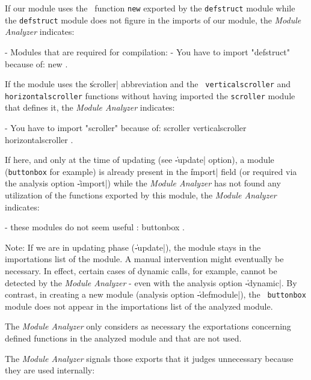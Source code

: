 If our module uses the \LeLisp\ function {\tt new} exported by the {\tt defstruct} module while the {\tt defstruct} module does not figure in the imports of our module, the {\em Module Analyzer} indicates:

\begin{Longcode*}
- Modules that are required for compilation:
- You have to import "defstruct" because of:
 new .
\end{Longcode*}

If the module uses the \|{scroller}| abbreviation and the {\tt
verticalscroller} and {\tt horizontalscroller} functions without having imported the {\tt scroller} module that defines it, the {\em Module Analyzer} indicates:

\begin{Longcode*}
- You have to import "scroller" because of:
 scroller verticalscroller horizontalscroller .
\end{Longcode*}

If here, and only at the time of updating (see \|-update| option), a module ({\tt buttonbox} for example) is already present in the \|import| field (or required via the analysis option \|-import|) while the {\em Module Analyzer} has not found any utilization of the functions exported by this module, the {\em Module Analyzer} indicates: 

\begin{Longcode*}
- these modules do not seem useful :
 buttonbox .
\end{Longcode*}
Note:  If we are in updating phase (\|-update|), the module stays in the importations list of the module.  A manual intervention might eventually be necessary.  In effect, certain cases of dynamic calls, for example, cannot be detected by the {\em Module Analyzer} - even with the analysis option \|-dynamic|.  By contrast, in creating a new module (analysis option \|-defmodule|), the {\tt
buttonbox} module does not appear in the importations list of the analyzed module.


The {\em Module Analyzer} only considers as necessary the exportations concerning defined functions in the analyzed module and that are not used.

The {\em Module Analyzer} signals those exports that it judges unnecessary because they are used internally:

